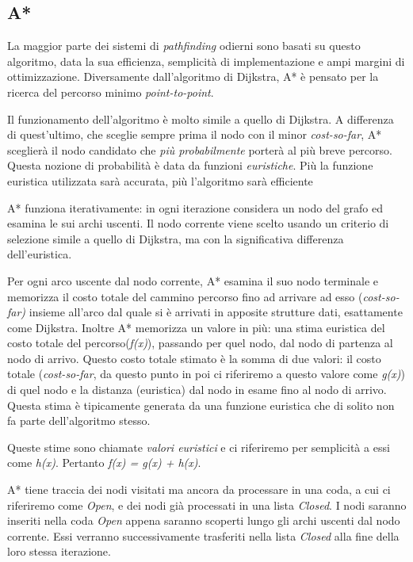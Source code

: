 \documentclass[11pt]{article}
\begin{document}
\subsection{A*}
La maggior parte dei sistemi di \emph{pathfinding} odierni sono basati su questo algoritmo, data la sua efficienza, semplicit\`a di implementazione e ampi margini di ottimizzazione.
Diversamente dall'algoritmo di Dijkstra, A* \`e pensato per la ricerca del percorso minimo \emph{point-to-point}.
\par{
Il funzionamento dell'algoritmo \`e molto simile a quello di Dijkstra. A differenza di quest'ultimo, che sceglie sempre prima il nodo con il minor \emph{cost-so-far}, A* sceglier\`a il nodo candidato che \emph{pi\`u probabilmente} porter\`a al pi\`u breve percorso. Questa nozione di probabilit\`a \`e data da funzioni \emph{euristiche}. Pi\`u la funzione euristica utilizzata sar\`a accurata, pi\`u l'algoritmo sar\`a efficiente
}
\par{
A* funziona iterativamente: in ogni iterazione considera un nodo del grafo ed esamina le sui archi uscenti. Il nodo corrente viene scelto usando un criterio di selezione simile a quello di Dijkstra, ma con la significativa differenza dell'euristica.
}
\par{
Per ogni arco uscente dal nodo corrente, A* esamina il suo nodo terminale e memorizza il costo totale del cammino percorso fino ad arrivare ad esso (\emph{cost-so-far)} insieme all'arco dal quale si \`e arrivati in apposite strutture dati, esattamente come Dijkstra. Inoltre A* memorizza un valore in pi\`u: una stima euristica del costo totale del percorso(\emph{f(x)}), passando per quel nodo, dal nodo di partenza al nodo di arrivo. Questo costo totale stimato \`e la somma di due valori: il costo totale (\emph{cost-so-far}, da questo punto in poi ci riferiremo a questo valore come \emph{g(x)}) di quel nodo e la distanza (euristica) dal nodo in esame fino al nodo di arrivo. Questa stima \`e tipicamente generata da una funzione euristica che di solito non fa parte dell'algoritmo stesso.
}
\par{
Queste stime sono chiamate \emph{valori euristici} e ci riferiremo per semplicit\`a a essi come \emph{h(x)}. Pertanto \emph{f(x) = g(x) + h(x)}.
}
\par{
A* tiene traccia dei nodi visitati ma ancora da processare in una coda, a cui ci riferiremo come \emph{Open}, e dei nodi gi\`a processati in una lista \emph{Closed}. I nodi saranno inseriti nella coda \emph{Open} appena saranno scoperti lungo gli archi uscenti dal nodo corrente. Essi verranno successivamente trasferiti nella lista \emph{Closed} alla fine della loro stessa iterazione.
}
\end{document}
